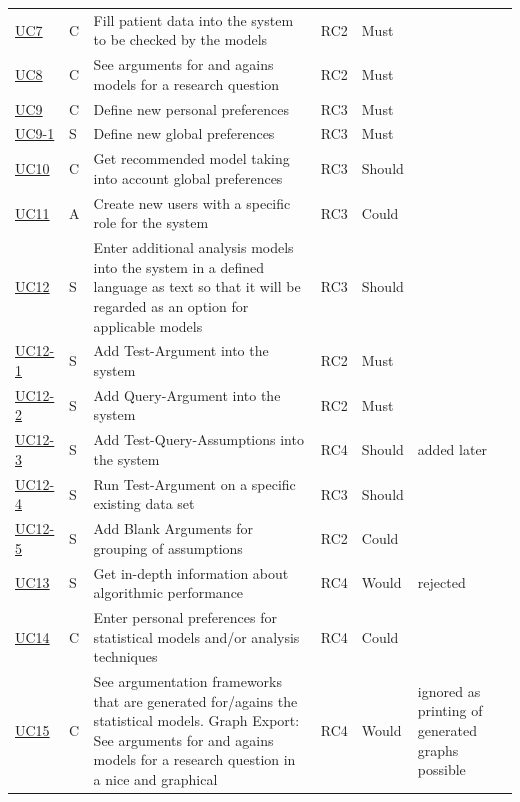 \begin{landscape}
\begin{longtable}{ l l p{10.5cm} l l p{3cm} }
		\href{https://trello.com/c/DidVQKAS}{UC7}   &   C & 	Fill patient data into the system to be checked by the models & RC2 & Must &  \\
		\href{https://trello.com/c/be2088JH}{UC8}	& 	C & 	See arguments for and agains models for a research question & RC2 & Must &   \\
		\href{https://trello.com/c/Ca9mA3uA}{UC9}   &   C & 	Define new personal preferences & RC3 & Must &   \\
		\href{https://trello.com/c/Ca9mA3uA}{UC9-1}   &   S & 	Define new global preferences & RC3 & Must &   \\
		\href{https://trello.com/c/1s656fA9}{UC10}  &   C & 	Get recommended model taking into account global preferences & RC3 & Should & 	 \\
		\href{https://trello.com/c/xUDStSOK}{UC11}  &   A & 	Create new users with a specific role for the system & RC3 & Could &    \\
		\href{https://trello.com/c/5UMo7o6U}{UC12}  &   S & 	Enter additional analysis models into the system in a defined language as text so that it will be regarded as an option for applicable models	& RC3 & Should & \\
		\href{https://trello.com/c/2V6Cl65u}{UC12-1}&   S & 	Add Test-Argument into the system & RC2 & Must & \\
		\href{https://trello.com/c/OwM2Z7wt}{UC12-2}&   S & 	Add Query-Argument into the system & RC2 & Must &  \\
		\href{https://trello.com/c/VThxB5aS}{UC12-3}&   S & 	Add Test-Query-Assumptions into the system & RC4 & Should & added later\\
		\href{https://trello.com/c/CkpJUNPW}{UC12-4}&   S & 	Run Test-Argument on a specific existing data set & RC3	& Should &  \\
		\href{https://trello.com/c/Rg6GPnNE}{UC12-5}&   S & 	Add Blank Arguments for grouping of assumptions & RC2 & Could & \\
		\href{https://trello.com/c/ORlMByiQ}{UC13}  &   S & 	Get in-depth information about algorithmic performance & RC4 & Would & rejected\\
		\href{https://trello.com/c/NcV3lo4w}{UC14}  &   C & 	Enter personal preferences for statistical models and/or analysis techniques & RC4 & Could &   \\
		\href{https://trello.com/c/BOUu2hKN}{UC15}  &   C & 	See argumentation frameworks that are generated for/agains the statistical models. Graph Export: See arguments for and agains models for a research question in a nice and graphical &RC4 & Would & 	 ignored as printing of generated graphs possible  \\

\end{longtable}
\end{landscape}
